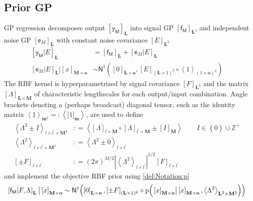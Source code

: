 \documentclass[preprint,12pt]{elsarticle}
\newcommand*{\M}[1]{\ensuremath{#1}\xspace}
\newcommand*{\x}{\times}
\newcommand*{\mi}[1]{\mathbf{#1}}
\newcommand*{\st}[1]{\mathbb{#1}}
\newcommand*{\rv}[1]{\mathsf{#1}}
\newcommand*{\te}[2][]{\left\lbrack{#2}\right\rbrack_{#1}}
\newcommand*{\tte}[2][]{\lbrack{#2}\rbrack_{#1}}
\newcommand*{\diag}[2][]{\left\langle{#2}\right\rangle_{#1}}
\newcommand*{\prob}[3]{\M{\mathrm{p}\!\left(\left.{#1}\right\vert{#2,#3}\right)}}
\newcommand*{\deq}{\M{\mathrel{\mathop:}=}}
\newcommand*{\deqr}{\M{=\mathrel{\mathop:}}}
\newcommand*{\gaussd}[2]{\mathsf{N}^{\dagger}\!\left({#1,#2}\right)}
\newcommand*{\modulus}[1]{\M{\left\lvert{#1}\right\rvert}}
\newcommand*{\set}[1]{\M{\left\lbrace{#1}\right\rbrace}}
\begin{document}
    \subsection{Prior GP} \label{sub:GPR:Prior}
        GP regression decomposes output $\te[\mi{L}]{\rv{y_M}}$ into signal GP $\te[\mi{L}]{\rv{f_M}}$, and independent noise GP $\te[\mi{L}]{\rv{e}_M}$ with constant noise covariance $\te[\mi{L}^2]{E}$
        \begin{equation*}
            \begin{aligned}
                \te[\mi{L}]{\rv{y_M}\vert E} 
                &= \te[\mi{L}]{\rv{f_M}} + \te[\mi{L}]{\rv{e}_M\vert E} \\
                \te[\mi{L}]{\rv{e}_M\vert E} \big\vert \te[\mi{M}\x\mi{o}]{x}
                &\sim \gaussd{\te[\mi{L}\x\mi{o}]{0}}{\te[(\mi{L}\x 1)^2]{E} \circ \diag[(1\x\mi{o})^2]{1}}
            \end{aligned}
        \end{equation*}
        The RBF kernel is hyperparametrized by signal covariance $\te[\mi{L}^2]{F}$ and the matrix $\te[\mi{L}\x\mi{M}]{\Lambda}$ of characteristic lengthscales for each output/input combination. 
        Angle brackets denoting a (perhaps broadcast) diagonal tensor, such as the identity matrix $\diag[\mi{m}^2]{1} \deqr \diag[]{\tte[\mi{m}]{1}}$, are used to define
        \begin{equation*}
            \begin{aligned}
                \diag[l\x l^{\prime}\x\mi{M}^{2}]{\Lambda^{2} \pm I} 
                &\deq \diag{\te[l\x\mi{M}]{\Lambda} \circ \te[l^{\prime}\x\mi{M}]{\Lambda} \pm \te[\mi{M}]{I}} 
                \qquad I \in \set{0}\cup\st{Z}^{+} \\
                \diag[l\x l^{\prime}\x\mi{M}^{2}]{\Lambda^{2}} &\deq 
                \diag[l\x l^{\prime}]{\Lambda^{2} \pm 0} \\
                    \te[l\x l^{\prime}]{\pm F} 
                &\deq (2 \pi)^{M/2} \modulus{\diag[l\x l^{\prime}]{\Lambda^{2}}}^{1/2} \te[l\x l^{\prime}]{F}
            \end{aligned}
        \end{equation*}
        and implement the objective RBF prior using \cref{def:Notation:p}
        \begin{equation*}
            \te[\mi{L}]{\rv{f_M} \vert F,\Lambda}
            \big\vert \te[\mi{M}\x\mi{o}]{x} \sim \\
            \gaussd{\te[\mi{L}\x\mi{o}]{0}}{\te[(\mi{L}\x 1)^{2}]{\pm F} \circ 
            \prob{\te[\mi{M}\x\mi{o}]{x}}{\te[\mi{M}\x\mi{o}]{x}}
            {\diag[\mi{L}^{2}\x\mi{M}^{2}]{\Lambda^{2}}}} 
        \end{equation*}
        
\end{document}
